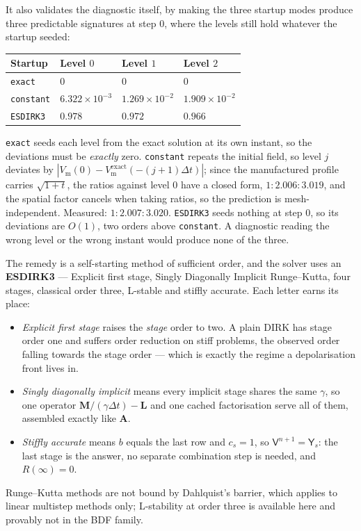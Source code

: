 \documentclass[11pt,a4paper]{article}
\newcommand{\code}[1]{\texttt{\small #1}}
\newcommand{\Vm}{V_{\text{m}}}
\newcommand{\Mmass}{\mathbf{M}}
\newcommand{\Lop}{\mathbf{L}}
\newcommand{\Aimp}{\mathbf{A}}
\begin{document}
It also validates the diagnostic itself, by making the three startup modes produce
three predictable signatures at step $0$, where the levels still hold whatever the
startup seeded:
\begin{center}
\begin{tabular}{@{}llll@{}}
\toprule
Startup & Level $0$ & Level $1$ & Level $2$ \\
\midrule
\code{exact}    & $0$ & $0$ & $0$ \\
\code{constant} & $6.322\times10^{-3}$ & $1.269\times10^{-2}$ & $1.909\times10^{-2}$ \\
\code{ESDIRK3}  & $0.978$ & $0.972$ & $0.966$ \\
\bottomrule
\end{tabular}
\end{center}
\code{exact} seeds each level from the exact solution at its own instant, so the
deviations must be \emph{exactly} zero. \code{constant} repeats the initial field,
so level $j$ deviates by $|\Vm(0)-\Vm^{\text{exact}}(-(j+1)\Delta t)|$; since the
manufactured profile carries $\sqrt{1+t}$, the ratios against level $0$ have a
closed form, $1:2.006:3.019$, and the spatial factor cancels when taking ratios,
so the prediction is mesh-independent. Measured: $1:2.007:3.020$. \code{ESDIRK3}
seeds nothing at step $0$, so its deviations are $O(1)$, two orders above
\code{constant}. A diagnostic reading the wrong level or the wrong instant would
produce none of the three.

The remedy is a self-starting method of sufficient order, and the solver uses an
\textbf{ESDIRK3} --- Explicit first stage, Singly Diagonally Implicit
Runge--Kutta, four stages, classical order three, L-stable and stiffly accurate.
Each letter earns its place:
\begin{itemize}
  \item \emph{Explicit first stage} raises the \emph{stage} order to two. A
        plain DIRK has stage order one and suffers order reduction on stiff
        problems, the observed order falling towards the stage order --- which
        is exactly the regime a depolarisation front lives in.
  \item \emph{Singly diagonally implicit} means every implicit stage shares the
        same $\gamma$, so one operator
        $\Mmass/(\gamma\Delta t)-\Lop$ and one cached factorisation serve all of
        them, assembled exactly like $\Aimp$.
  \item \emph{Stiffly accurate} means $b$ equals the last row and $c_s=1$, so
        $\mathsf{V}^{n+1}=\mathsf{Y}_s$: the last stage is the answer, no
        separate combination step is needed, and $R(\infty)=0$.
\end{itemize}
Runge--Kutta methods are not bound by Dahlquist's barrier, which applies to
linear multistep methods only; L-stability at order three is available here and
provably not in the BDF family.
\end{document}

